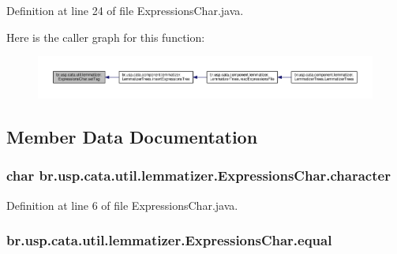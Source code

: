 Definition at line 24 of file Expressions\+Char.\+java.



Here is the caller graph for this function\+:\nopagebreak
\begin{figure}[H]
\begin{center}
\leavevmode
\includegraphics[width=350pt]{classbr_1_1usp_1_1cata_1_1util_1_1lemmatizer_1_1_expressions_char_a2a81785bc3fe2c7e8c31a85d2af7722e_icgraph}
\end{center}
\end{figure}




\subsection{Member Data Documentation}
\hypertarget{classbr_1_1usp_1_1cata_1_1util_1_1lemmatizer_1_1_expressions_char_a7a45e37104be7827a33cb60a605a3f23}{
\subsubsection[{character}]{\setlength{\rightskip}{0pt plus 5cm}char br.\+usp.\+cata.\+util.\+lemmatizer.\+Expressions\+Char.\+character\hspace{0.3cm}{\ttfamily [private]}}}\label{classbr_1_1usp_1_1cata_1_1util_1_1lemmatizer_1_1_expressions_char_a7a45e37104be7827a33cb60a605a3f23}


Definition at line 6 of file Expressions\+Char.\+java.

\hypertarget{classbr_1_1usp_1_1cata_1_1util_1_1lemmatizer_1_1_expressions_char_a52e73821402ecfc5c59421de06abc677}{
\subsubsection[{equal}]{ br.\+usp.\+cata.\+util.\+lemmatizer.\+Expressions\+Char.\+equal\hspace{0.3cm}{\ttfamily [private]}}}\label{classbr_1_1usp_1_1cata_1_1util_1_1lemmatizer_1_1_expressions_char_a52e73821402ecfc5c59421de06abc677}


